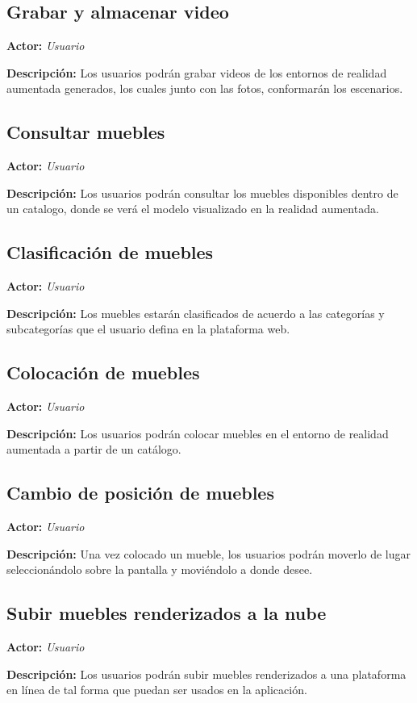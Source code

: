 \subsection{Grabar y almacenar video}
\textbf{Actor:} \textit{Usuario} \par
\textbf{Descripción:} Los usuarios podrán grabar videos de los entornos de realidad aumentada generados, los cuales junto con las fotos, conformarán los escenarios.


\subsection{Consultar muebles}
\textbf{Actor:} \textit{Usuario} \par
\textbf{Descripción:} Los usuarios podrán consultar los muebles disponibles dentro de un catalogo, donde se verá el modelo visualizado en la realidad aumentada.

\subsection{Clasificación de muebles}
\textbf{Actor:} \textit{Usuario} \par
\textbf{Descripción:} Los muebles estarán clasificados de acuerdo a las categorías y subcategorías que el usuario defina en la plataforma web.

\subsection{Colocación de muebles}
\textbf{Actor:} \textit{Usuario} \par
\textbf{Descripción:}  Los usuarios podrán colocar muebles en el entorno de realidad aumentada a partir de un catálogo.

\subsection{Cambio de posición de muebles}
\textbf{Actor:} \textit{Usuario} \par
\textbf{Descripción:}  Una vez colocado un mueble, los usuarios podrán moverlo de lugar seleccionándolo sobre la pantalla y moviéndolo a donde desee.

\subsection{Subir muebles renderizados a la nube}
\textbf{Actor:} \textit{Usuario} \par
\textbf{Descripción:}  Los usuarios podrán subir muebles renderizados a una plataforma en línea de tal forma que puedan ser usados en la aplicación.

